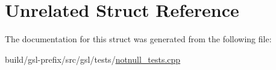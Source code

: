 \hypertarget{structUnrelated}{}\section{Unrelated Struct Reference}
\label{structUnrelated}


The documentation for this struct was generated from the following file\+:\begin{DoxyCompactItemize}
\item 
build/gsl-\/prefix/src/gsl/tests/\hyperlink{notnull__tests_8cpp}{notnull\+\_\+tests.\+cpp}\end{DoxyCompactItemize}
